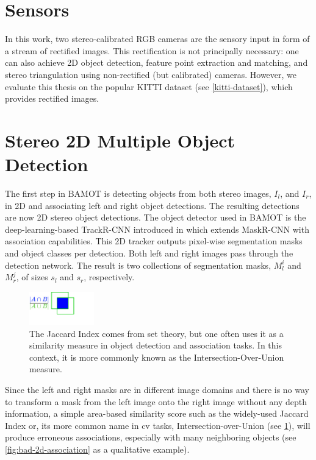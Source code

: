 \documentclass[headsepline, hidelinks, footsepline, footinclude=false, oneside, fontsize=11pt, paper=a4, listof=totoc, bibliography=totoc]{scrbook}
\begin{document}
\section{Sensors}
\label{sec:org186f36f}
    In this work, two stereo-calibrated RGB cameras are the sensory input in form of a stream of rectified images. 
This rectification is not principally necessary: 
one can also achieve 2D object detection, feature point extraction and matching, and stereo triangulation using non-rectified (but calibrated) cameras.
However, we evaluate this thesis on the popular KITTI dataset (see \cref{kitti-dataset}), which provides rectified images.
\section{Stereo 2D Multiple Object Detection \label{stereo-2d-mod}}
\label{sec:org5d5e62c}
    The first step in BAMOT is detecting objects from both stereo images, \(I_l\), and \(I_r\), in 2D and associating left and right object detections. The resulting detections are now 2D stereo object detections.
The object detector used in BAMOT is the deep-learning-based TrackR-CNN introduced in \Cite{voigtlaenderMOTSMultiObjectTracking2019} which extends MaskR-CNN \cite{heMaskRCNN2018} with association capabilities. 
This 2D tracker outputs pixel-wise segmentation masks and object classes per detection. 
Both left and right images pass through the detection network. The result is two collections of segmentation masks, \(M_l^i\) and \(M_r^j\), of sizes \(s_l\) and \(s_r\), respectively.

\begin{figure}[htbp]
\centering
\includegraphics[width=0.25\textwidth]{figures/iou.pdf}
\caption{\label{fig:iou}The Jaccard Index comes from set theory, but one often uses it as a similarity measure in object detection and association tasks. In this context, it is more commonly known as the Intersection-Over-Union measure.}
\end{figure}

Since the left and right masks are in different image domains and there is no way to transform a mask from the left image onto the right image without any depth information,
a simple area-based similarity score such as the widely-used Jaccard Index \cite{jaccardDISTRIBUTIONFLORAALPINE1912} or, its more common name in \gls{cv} tasks, Intersection-over-Union (see \cref{fig:iou}),
will produce erroneous associations, especially with many neighboring objects (see \cref{fig:bad-2d-association} as a qualitative example).
\end{document}
